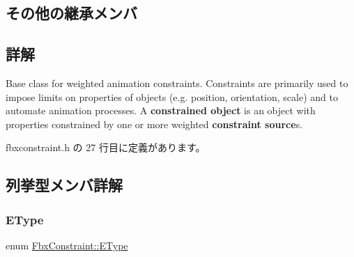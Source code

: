 \subsection*{その他の継承メンバ}


\subsection{詳解}
Base class for weighted animation constraints. Constraints are primarily used to impose limits on properties of objects (e.\+g. position, orientation, scale) and to automate animation processes. A {\bfseries constrained object} is an object with properties constrained by one or more weighted {\bfseries constraint source}s. 

 fbxconstraint.\+h の 27 行目に定義があります。



\subsection{列挙型メンバ詳解}
\mbox{\label{class_fbx_constraint_a49c1634663395eab7c28856df233ec66}} 
\subsubsection{\texorpdfstring{E\+Type}{EType}}
{\footnotesize\ttfamily enum \hyperlink{class_fbx_constraint_a49c1634663395eab7c28856df233ec66}{Fbx\+Constraint\+::\+E\+Type}}

